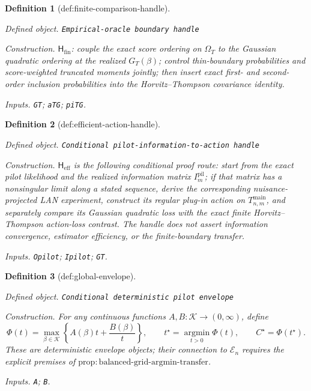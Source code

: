 \documentclass{article}
\newtheorem{definition}{Definition}
\begin{document}
\begin{definition}[def:finite-comparison-handle]\label{def:finite-comparison-handle}
\par\smallskip\noindent\emph{Defined object.} \texttt{Empirical-\allowbreak{}oracle boundary handle}
\par\smallskip\noindent\emph{Construction.} \(\mathsf H_{\mathrm{fin}}\): couple the exact score ordering on \(\Omega_T\) to the Gaussian quadratic ordering at the realized \(G_T(\beta)\); control thin-boundary probabilities and score-weighted truncated moments jointly; then insert exact first- and second-order inclusion probabilities into the Horvitz--Thompson covariance identity.
\par\smallskip\noindent\emph{Inputs.} \texttt{GT}; \texttt{aTG}; \texttt{piTG}.
\end{definition}

\begin{definition}[def:efficient-action-handle]\label{def:efficient-action-handle}
\par\smallskip\noindent\emph{Defined object.} \texttt{Conditional pilot-\allowbreak{}information-\allowbreak{}to-\allowbreak{}action handle}
\par\smallskip\noindent\emph{Construction.} \(\mathsf H_{\mathrm{eff}}\) is the following conditional proof route: start from the exact pilot likelihood and the realized information matrix \(I_m^{\mathrm{pil}}\); if that matrix has a nonsingular limit along a stated sequence, derive the corresponding nuisance-projected LAN experiment, construct its regular plug-in action on \(T_{n,m}^{\mathrm{main}}\), and separately compare its Gaussian quadratic loss with the exact finite Horvitz--Thompson action-loss contrast.  The handle does not assert information convergence, estimator efficiency, or the finite-boundary transfer.
\par\smallskip\noindent\emph{Inputs.} \texttt{Opilot}; \texttt{Ipilot}; \texttt{GT}.
\end{definition}

\begin{definition}[def:global-envelope]\label{def:global-envelope}
\par\smallskip\noindent\emph{Defined object.} \texttt{Conditional deterministic pilot envelope}
\par\smallskip\noindent\emph{Construction.} For any continuous functions \(A,B:\mathcal K\to(0,\infty)\), define
\[
\Phi(t)=\max_{\beta\in\mathcal K}
\left\{A(\beta)t+\frac{B(\beta)}{t}\right\},
\qquad
t^\star=\operatorname*{argmin}_{t>0}\Phi(t),
\qquad
C^\star=\Phi(t^\star).
\]
These are deterministic envelope objects; their connection to \(\mathcal E_n\) requires the explicit premises of \(\mathrm{prop{:}balanced\text{-}grid\text{-}argmin\text{-}transfer}\).
\par\smallskip\noindent\emph{Inputs.} \texttt{A}; \texttt{B}.
\end{definition}
\end{document}
